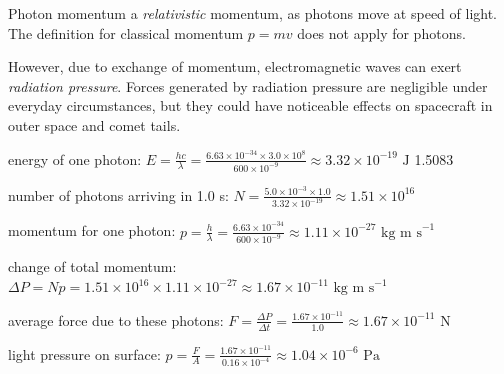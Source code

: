 Photon momentum a \emph{relativistic} momentum, as photons move at speed of light. The definition for classical momentum $p=mv$ does not apply for photons.

However, due to exchange of momentum, electromagnetic waves can exert \emph{radiation pressure}. Forces generated by radiation pressure are negligible under everyday circumstances, but they could have noticeable effects on spacecraft in outer space and comet tails.


\begin{soln}
    
 energy of one photon: $E= \frac{hc}{\lambda} = \frac{6.63\times10^{-34} \times 3.0\times10^8}{600\times10^{-9}} \approx 3.32 \times 10^{-19} \text{ J}$ 1.5083


number of photons arriving in 1.0 s: $N = \frac{5.0\times10^{-3} \times 1.0}{3.32 \times 10^{-19}} \approx 1.51\times10^{16}$

momentum for one photon: $p = \frac{h}{\lambda} = \frac{6.63\times10^{-34}}{600\times10^{-9}} \approx 1.11 \times 10^{-27} \text{ kg m s}^{-1}$

change of total momentum: $\Delta P = Np = 1.51\times10^{16} \times 1.11 \times 10^{-27} \approx 1.67 \times 10^{-11} \text{ kg m s}^{-1}$

average force due to these photons: $F = \frac{\Delta P}{\Delta t} = \frac{1.67 \times 10^{-11}}{1.0} \approx 1.67 \times 10^{-11} \text{ N}$

light pressure on surface: $p = \frac{F}{A} = \frac{1.67 \times 10^{-11}}{0.16 \times 10^{-4}} \approx 1.04 \times 10^{-6} \text{ Pa}$ \end{soln}



